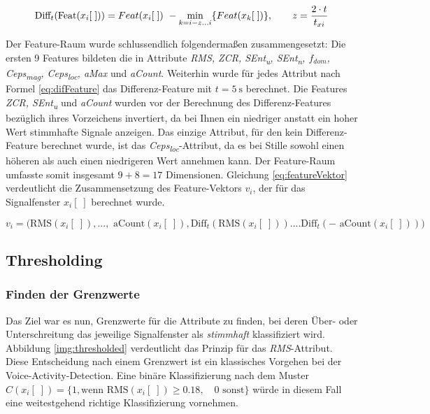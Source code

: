 \begin{equation}
\text{Diff}_t(\text{Feat}(x_i[\;])) = Feat(x_i[\;])\ - \operatorname*{min}_{k=i-z...i}\{Feat(x_k[\;])\}, \qquad z = \frac{2 \cdot t}{t_{xi}}
\label{eq:difFeature}
\end{equation}

Der Feature-Raum wurde schlussendlich folgendermaßen zusammengesetzt: Die ersten 9 Features bildeten die in Attribute \emph{RMS, ZCR, SEnt\textsubscript{u}, SEnt\textsubscript{n}, $f_{dom}$, Ceps\textsubscript{mag}, Ceps\textsubscript{loc}, aMax} und \emph{aCount}. Weiterhin wurde für jedes Attribut nach Formel \ref{eq:difFeature} das Differenz-Feature mit $t = \SI{5}{\second}$ berechnet. Die Features \emph{ZCR, SEnt\textsubscript{u}} und \emph{aCount} wurden vor der Berechnung des Differenz-Features bezüglich ihres Vorzeichens invertiert, da bei Ihnen ein niedriger anstatt ein hoher Wert stimmhafte Signale anzeigen. Das einzige Attribut, für den kein Differenz-Feature berechnet wurde, ist das \emph{Ceps\textsubscript{loc}}-Attribut, da es bei Stille sowohl einen höheren als auch einen niedrigeren Wert annehmen kann. Der Feature-Raum umfasste somit insgesamt $9 + 8 = 17 $ Dimensionen. Gleichung \ref{eq:featureVektor} verdeutlicht die Zusammensetzung des Feature-Vektors $v_i$, der für das Signalfenster $x_i[\;]$ berechnet wurde.

\begin{equation}
v_i = \Big( \text{RMS}(x_i[\;]), ...,\text{ aCount}(x_i[\;]), 
\text{Diff}_{t}(\text{RMS}(x_i[\;])) .... \text{Diff}_{t}(-\text{ aCount}(x_i[\;]))\Big)
\label{eq:featureVektor}
\end{equation}

\subsection{Thresholding}
\label{sec:vad_thresholding}

\subsubsection{Finden der Grenzwerte}

Das Ziel war es nun, Grenzwerte für die Attribute zu finden, bei deren Über- oder Unterschreitung das jeweilige  Signalfenster als \emph{stimmhaft} klassifiziert wird. Abbildung \ref{img:thresholded} verdeutlicht das Prinzip für das \emph{RMS}-Attribut. Diese Entscheidung nach einem Grenzwert ist ein klassisches Vorgehen bei der Voice-Activity-Detection. Eine binäre Klassifizierung nach dem Muster $C(x_i[\;]) = \{ 1, \text{wenn } \text{RMS}(x_i[\;]) \geq 0.18 ,\quad 0 \text{ sonst}\}$ würde in diesem Fall eine weitestgehend richtige Klassifizierung vornehmen.

